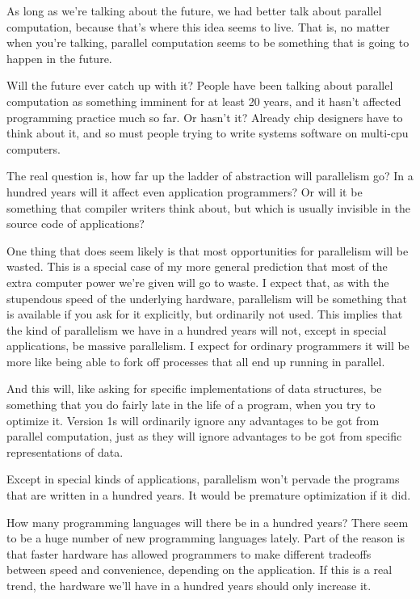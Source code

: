 As long as we're talking about the future, we had better talk about
parallel computation, because that's where this idea seems to live. That
is, no matter when you're talking, parallel computation seems to be
something that is going to happen in the future.

Will the future ever catch up with it? People have been talking about
parallel computation as something imminent for at least 20 years, and it
hasn't affected programming practice much so far. Or hasn't it? Already
chip designers have to think about it, and so must people trying to
write systems software on multi-cpu computers.

The real question is, how far up the ladder of abstraction will
parallelism go? In a hundred years will it affect even application
programmers? Or will it be something that compiler writers think about,
but which is usually invisible in the source code of applications?

One thing that does seem likely is that most opportunities for
parallelism will be wasted. This is a special case of my more general
prediction that most of the extra computer power we're given will go to
waste. I expect that, as with the stupendous speed of the underlying
hardware, parallelism will be something that is available if you ask for
it explicitly, but ordinarily not used. This implies that the kind of
parallelism we have in a hundred years will not, except in special
applications, be massive parallelism. I expect for ordinary programmers
it will be more like being able to fork off processes that all end up
running in parallel.

And this will, like asking for specific implementations of data
structures, be something that you do fairly late in the life of a
program, when you try to optimize it. Version 1s will ordinarily ignore
any advantages to be got from parallel computation, just as they will
ignore advantages to be got from specific representations of data.

Except in special kinds of applications, parallelism won't pervade the
programs that are written in a hundred years. It would be premature
optimization if it did.

How many programming languages will there be in a hundred years? There
seem to be a huge number of new programming languages lately. Part of
the reason is that faster hardware has allowed programmers to make
different tradeoffs between speed and convenience, depending on the
application. If this is a real trend, the hardware we'll have in a
hundred years should only increase it.

